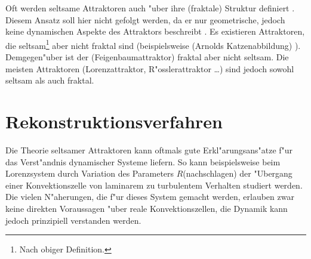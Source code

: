 Oft werden seltsame Attraktoren auch "uber ihre \begriff(fraktale) Struktur
definiert \cite{Peitgen92}. Diesem Ansatz soll hier nicht gefolgt werden, da er nur
geometrische, jedoch keine dynamischen Aspekte des Attraktors beschreibt
\cite{eckmann-ruelle}. Es existieren Attraktoren, die seltsam\footnote{Nach obiger
Definition.} aber nicht fraktal sind (beispielsweise \begriff(Arnolds Katzenabbildung)
\cite{Arnold68}). Demgegen"uber ist der \begriff(Feigenbaumattraktor) fraktal aber nicht
seltsam. Die meisten Attraktoren (Lorenzattraktor, R"osslerattraktor \dots) sind jedoch
sowohl seltsam als auch fraktal.


\section{Rekonstruktionsverfahren}

Die Theorie seltsamer Attraktoren kann oftmals gute Erkl"arungsans"atze f"ur das Ver\-st"andnis
dynamischer Systeme liefern. So kann beispielsweise beim Lorenzsystem durch
Variation des Parameters $R$\korrektur(nachschlagen) der "Ubergang einer Konvektionszelle
von laminarem zu turbulentem Verhalten studiert werden. Die vielen N"aherungen, die f"ur
dieses System gemacht werden, erlauben zwar keine direkten Voraussagen "uber reale 
Konvektionszellen, die Dynamik kann jedoch prinzipiell verstanden werden.

